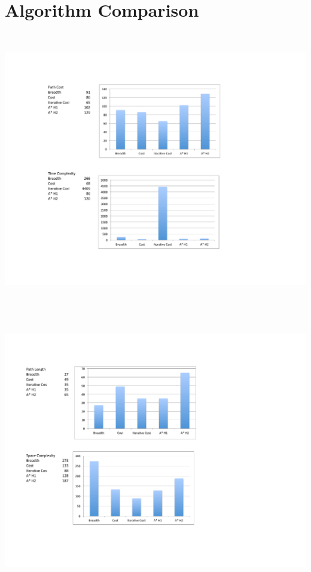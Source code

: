 \documentclass[12pt]{article}
\begin{document}
\section{Algorithm Comparison}
	\begin{center}
		\includegraphics[width=150mm,height=120mm]{images/results1.pdf}
	\end{center}
	\begin{center}
		\includegraphics[width=150mm,height=120mm]{images/results2.pdf}
	\end{center}
\end{document}
